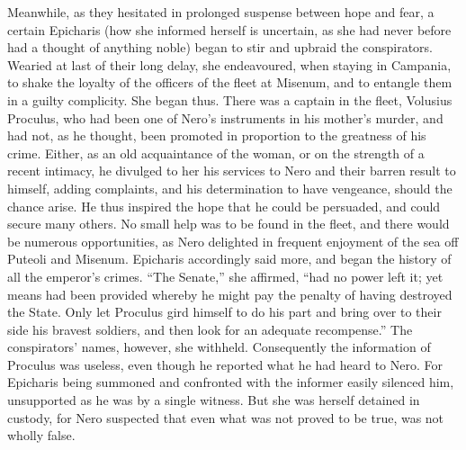 Meanwhile, as they hesitated in prolonged suspense between hope and fear, a certain Epicharis (how she informed herself is uncertain, as she had never before had a thought of anything noble) began to stir and upbraid the conspirators. Wearied at last of their long delay, she endeavoured, when staying in Campania, to shake the loyalty of the officers of the fleet at Misenum, and to entangle them in a guilty complicity. She began thus. There was a captain in the fleet, Volusius Proculus, who had been one of Nero's instruments in his mother's murder, and had not, as he thought, been promoted in proportion to the greatness of his crime. Either, as an old acquaintance of the woman, or on the strength of a recent intimacy, he divulged to her his services to Nero and their barren result to himself, adding complaints, and his determination to have vengeance, should the chance arise. He thus inspired the hope that he could be persuaded, and could secure many others. No small help was to be found in the fleet, and there would be numerous opportunities, as Nero delighted in frequent enjoyment of the sea off Puteoli and Misenum. Epicharis accordingly said more, and began the history of all the emperor's crimes. ``The Senate,'' she affirmed, ``had no power left it; yet means had been provided whereby he might pay the penalty of having destroyed the State. Only let Proculus gird himself to do his part and bring over to their side his bravest soldiers, and then look for an adequate recompense.'' The conspirators' names, however, she withheld. Consequently the information of Proculus was useless, even though he reported what he had heard to Nero. For Epicharis being summoned and confronted with the informer easily silenced him, unsupported as he was by a single witness. But she was herself detained in custody, for Nero suspected that even what was not proved to be true, was not wholly false.


